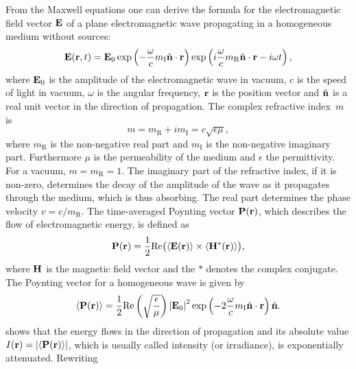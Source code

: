  From the Maxwell equations one can derive the formula for the
electromagnetic field vector $\mathbf{E}$ of a plane electromagnetic
wave propagating in a homogeneous medium without sources:
\begin{equation}
  \mathbf{E}(\mathbf{r}, t) =
  \mathbf{E}_0
  \exp\left(-\frac{\omega}{c} m_{\mathrm{I}} \hat{{\bf n}} \cdot \mathbf{r}\right)
  \exp\left(i \frac{\omega}{c} m_{\mathrm{R}} \hat{{\bf n}} \cdot \mathbf{r}  - i \omega t \right),
\end{equation}
where $\mathbf{E}_0$ is the amplitude of the electromagnetic wave in
vacuum, $c$ is the speed of light in vacuum, $\omega$ is the angular
frequency, $\mathbf{r}$ is the position vector and $\hat{{\bf n}}$
is a real unit vector in the direction of propagation. The complex
refractive index~$m$ is
\begin{equation}
  m = m_{\mathrm{R}}+ i m_{\mathrm{I}} = c \sqrt{\epsilon \mu},
\end{equation}
where $m_{\mathrm{R}}$ is the non-negative real part and $m_{\mathrm{I}}$ is the non-negative imaginary part. Furthermore $\mu$ is the
permeability of the medium and $\epsilon$ the permittivity.  For a
vacuum, $m = m_{\mathrm{R}} = 1$.  The imaginary part of the refractive
index, if it is non-zero, determines the decay of the amplitude of the
wave as it propagates through the medium, which is thus absorbing.
The real part determines the phase velocity $v = c/m_{\mathrm{R}}$.
The time-averaged Poynting vector $\mathbf{P}(\mathbf{r})$, which describes the
flow of electromagnetic energy, is defined as
\begin{equation}
   \mathbf{P}(\mathbf{r}) =
     \frac{1}{2} \mathrm{Re} \bigl(\left\langle \mathbf{E}(\mathbf{r}) \right\rangle \times
     \left\langle \mathbf{H}^*(\mathbf{r}) \right\rangle\bigr),
\end{equation}
where $\mathbf{H}$ is the magnetic field vector and the $*$ denotes the
complex conjugate. The Poynting vector for a homogeneous wave is given
by
\begin{equation}
\label{eq:rtetheory:Poynting_vec}
  \left\langle \mathbf{P}(\mathbf{r}) \right\rangle =
   \frac{1}{2}\mathrm{Re} \left( \sqrt{\frac{\epsilon}{\mu}} \right)
   \left| \mathbf{E}_0 \right| ^2
   \exp\left(-2\frac{\omega}{c} m_{\mathrm{I}} \hat{{\bf n}} \cdot
     \mathbf{r}\right) \hat{{\bf n}}.
\end{equation}
 shows that the energy flows in the
direction of propagation and its absolute value $I(\mathbf{r}) =
\left| \left\langle \mathbf{P}(\mathbf{r}) \right\rangle \right| $, which is usually called
intensity (or irradiance), is exponentially attenuated. Rewriting
